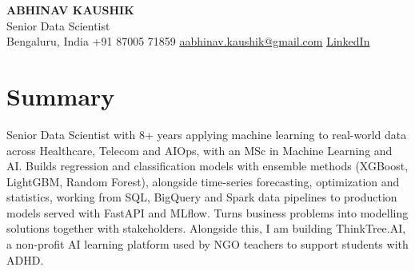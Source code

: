 \documentclass[10pt,a4paper]{article}
\begin{document}
\begin{center}
  {\LARGE\bfseries ABHINAV KAUSHIK}\\[2pt]
  {\large Senior Data Scientist}\\[2pt]
  Bengaluru, India \textbar{} +91 87005 71859 \textbar{} \href{mailto:aabhinav.kaushik@gmail.com}{aabhinav.kaushik@gmail.com} \textbar{} \href{https://www.linkedin.com/in/abhinav-kaushik10/}{LinkedIn}  
\end{center}

\section{Summary}
Senior Data Scientist with 8+ years applying machine learning to real-world data across Healthcare, Telecom and AIOps, with an MSc in Machine Learning and AI. Builds regression and classification models with ensemble methods (XGBoost, LightGBM, Random Forest), alongside time-series forecasting, optimization and statistics, working from SQL, BigQuery and Spark data pipelines to production models served with FastAPI and MLflow. Turns business problems into modelling solutions together with stakeholders. Alongside this, I am building ThinkTree.AI, a non-profit AI learning platform used by NGO teachers to support students with ADHD.
\end{document}
